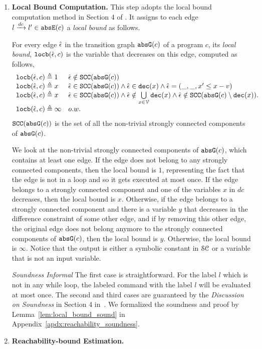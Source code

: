 \begin{enumerate}
\item \textbf{Local Bound Computation.}
This step adopts the local bound computation method in Section 4 of \cite{SinnZV17}.
It assigns to each edge $l \xrightarrow{dc} l'\in \mathtt{abs}{\mathtt{E}}(c)$ a \emph{local bound} as follows.
\begin{defn}
 \label{def:ranking_gen}
For every edge $\hat{\mathtt{\epsilon}{}}$ in the transition graph $\mathtt{abs}{\mathtt{G}}(c)$ of a program $c$,
its \emph{local bound}, $\mathtt{locb}(\hat{\mathtt{\epsilon}{}}, c)$
is the variable that decreases on this edge, computed as follows,
%
\[ 
\begin{array}{ll}
 \mathtt{locb}(\hat{\mathtt{\epsilon}{}}, c) \triangleq 1 
 & \hat{\mathtt{\epsilon}{}} \notin \mathtt{SCC}(\mathtt{abs}{\mathtt{G}}(c))
 \\
 \mathtt{locb}(\hat{\mathtt{\epsilon}{}}, c) \triangleq x
 & \hat{\mathtt{\epsilon}{}} \in \mathtt{SCC}(\mathtt{abs}{\mathtt{G}}(c)) \land \hat{\mathtt{\epsilon}{}} \in \mathtt{dec}(x) \land \hat{\mathtt{\epsilon}{}} = (\_, \_ , x' \leq x - v) \\
 \mathtt{locb}(\hat{\mathtt{\epsilon}{}}, c) \triangleq x
 & \hat{\mathtt{\epsilon}{}} \in \mathtt{SCC}(\mathtt{abs}{\mathtt{G}}(c)) \land 
 \hat{\mathtt{\epsilon}{}} \notin \bigcup\limits_{x \in \mathcal{V}} \mathtt{dec}(x)
 \land \hat{\mathtt{\epsilon}{}} \notin \mathtt{SCC}(\mathtt{abs}{\mathtt{G}}(c) \setminus \mathtt{dec}(x)). \\
 \mathtt{locb}(\hat{\mathtt{\epsilon}{}}, c) \triangleq \infty & o.w.
\end{array}
\]
$\mathtt{SCC}(\mathtt{abs}{\mathtt{G}}(c))$ is the set of all the non-trivial strongly connected components of $\mathtt{abs}{\mathtt{G}}(c)$.
\end{defn}
We look at the non-trivial strongly connected components of $\mathtt{abs}{\mathtt{G}}(c)$, which contains at least one edge.
If the edge does not belong to any strongly connected components, then the local bound is $1$, representing the fact that the edge is not in a loop and so it gets executed at most once.
If the edge belongs to a strongly connected component and one of the variables $x$ in $dc$ decreases, then the local bound is $x$.
Otherwise, if the edge belongs to a strongly connected component and there is a variable $y$ that decreases in the difference constraint of some other edge, and if by removing this other edge, the original edge does not belong anymore to the strongly connected components of $\mathtt{abs}{\mathtt{G}}(c)$, then the local bound is $y$.
Otherwise, the local bound is $\infty$. 
Notice that the output is either a symbolic constant in $\mathcal{SC}$ or a variable that is not an input variable.

\emph{Soundness Informal}
 The first case is straightforward. 
 For the label $l$ which is not in any while loop, 
 the labeled command with the label $l$ will be 
 evaluated at most once. 
 The second and third cases are guaranteed by the \emph{Discussion on Soundness} in Section 4 in~\cite{SinnZV17}.
 We formalized the soundness and proof by Lemma~\ref{lem:local_bound_sound} in Appendix~\ref{apdx:reachability_soundness}.
\item \textbf{Reachability-bound Estimation.}


\end{enumerate}
